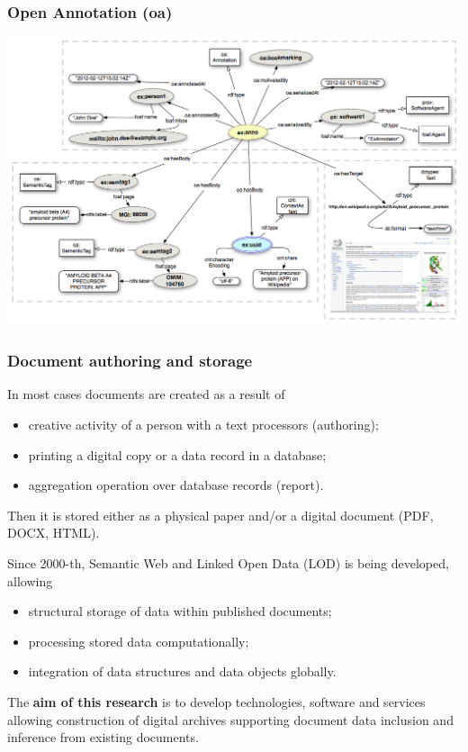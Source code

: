 \documentclass[10pt]{beamer}
\begin{document}
\begin{frame}
  \frametitle{Open Annotation (oa)}
\begin{adjustwidth}{-3em}{-3em}
  \centering
  \includegraphics[width=1\linewidth]{Open-Annotation_CB_Bookmarking_and_Semantically_Tagging_A_webpage_spec20130128.png}
\end{adjustwidth}

\end{frame}

\begin{frame}
  \frametitle{Document authoring and storage}
  In most cases documents are created as a result of
  \begin{itemize}
  \item creative activity of a person with a text processors (authoring);
  \item printing a digital copy or a data record in a database;
  \item aggregation operation over database records (report).
  \end{itemize}
  Then it is stored either as a physical paper and/or a digital document (PDF, DOCX, HTML).

  Since 2000-th, Semantic Web and Linked Open Data (LOD) is being developed, allowing
  \begin{itemize}
  \item structural storage of data within published documents;
  \item processing stored data computationally;
  \item integration of data structures and data objects globally.
  \end{itemize}

  The \textbf{aim of this research} is to develop technologies, software and services allowing construction of digital archives supporting document data inclusion and inference from existing documents.
\end{frame}
\end{document}
